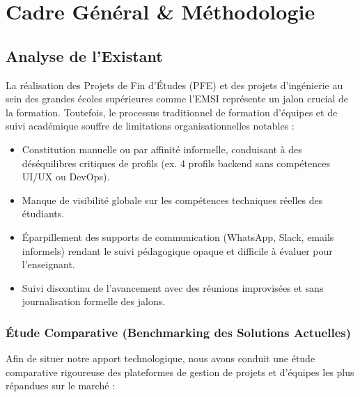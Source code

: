 \documentclass[11pt,a4paper,titlepage]{article}
\begin{document}
\tableofcontents
\newpage
\listoffigures
\listoftables
\newpage

\section{Cadre Général \& Méthodologie}

\subsection{Analyse de l'Existant}

La réalisation des Projets de Fin d'Études (PFE) et des projets d'ingénierie au sein des grandes écoles supérieures comme l'EMSI représente un jalon crucial de la formation. Toutefois, le processus traditionnel de formation d'équipes et de suivi académique souffre de limitations organisationnelles notables :
\begin{itemize}[leftmargin=1.5cm]
    \item Constitution manuelle ou par affinité informelle, conduisant à des déséquilibres critiques de profils (ex. 4 profils backend sans compétences UI/UX ou DevOps).
    \item Manque de visibilité globale sur les compétences techniques réelles des étudiants.
    \item Éparpillement des supports de communication (WhatsApp, Slack, emails informels) rendant le suivi pédagogique opaque et difficile à évaluer pour l'enseignant.
    \item Suivi discontinu de l'avancement avec des réunions improvisées et sans journalisation formelle des jalons.
\end{itemize}

\subsubsection{Étude Comparative (Benchmarking des Solutions Actuelles)}

Afin de situer notre apport technologique, nous avons conduit une étude comparative rigoureuse des plateformes de gestion de projets et d'équipes les plus répandues sur le marché :
\end{document}
